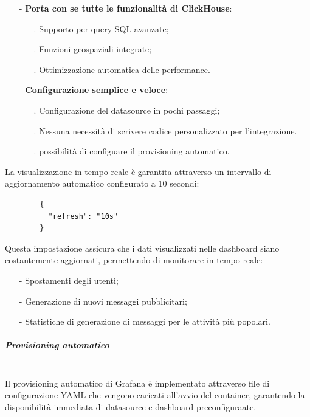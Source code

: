 \documentclass[10pt]{article}
\newcommand{\mysubparagraph}[1]{\subparagraph{#1}\mbox{}\\}
\begin{document}
        \begin{itemize}
            \item[-] \textbf{Porta con se tutte le funzionalità di ClickHouse}:
            \begin{itemize}
                \item[.] Supporto per query SQL avanzate;
                \item[.] Funzioni geospaziali integrate;
                \item[.] Ottimizzazione automatica delle performance.
            \end{itemize}
            \item[-] \textbf{Configurazione semplice e veloce}:
            \begin{itemize}
                \item[.] Configurazione del datasource in pochi passaggi;
                \item[.] Nessuna necessità di scrivere codice personalizzato per l'integrazione.
                \item[.] possibilità di configuare il provisioning automatico.
            \end{itemize}
        \end{itemize}

        La visualizzazione in tempo reale è garantita attraverso un intervallo di aggiornamento automatico configurato a 10 secondi:

        \begin{lstlisting}
        {
          "refresh": "10s"
        }
        \end{lstlisting}

        Questa impostazione assicura che i dati visualizzati nelle dashboard siano costantemente aggiornati, permettendo di monitorare in tempo reale:
        \begin{itemize}
            \item[-] Spostamenti degli utenti;
            \item[-] Generazione di nuovi messaggi pubblicitari;
            \item[-] Statistiche di generazione di messaggi per le attività più popolari.
        \end{itemize}

        \mysubparagraph{Provisioning automatico}
        Il provisioning automatico di Grafana è implementato attraverso file di configurazione YAML che vengono caricati all'avvio del container, garantendo la disponibilità immediata di datasource e dashboard preconfiguraate.
\end{document}
